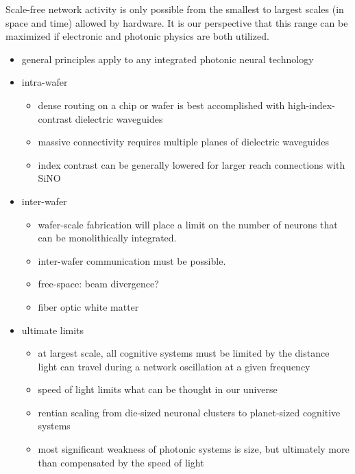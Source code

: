 \documentclass[twocolumn]{article}
\begin{document}
Scale-free network activity is only possible from the smallest to largest scales (in space and  time) allowed by hardware. It is our perspective that this range can be maximized if electronic and photonic physics are both utilized.

\begin{itemize}
\item general principles apply to any integrated photonic neural technology
\item intra-wafer

\begin{itemize}
\item dense routing on a chip or wafer is best accomplished with high-index-contrast dielectric waveguides
\item massive connectivity requires multiple planes of dielectric waveguides
\item index contrast can be generally lowered for larger reach connections with SiNO
\end{itemize}

\item inter-wafer
\begin{itemize}
\item wafer-scale fabrication will place a limit on the number of neurons that can be monolithically integrated. 
\item inter-wafer communication must be possible. 
\item free-space: beam divergence?
\item fiber optic white matter
\end{itemize}

\item ultimate limits
\begin{itemize}
\item at largest scale, all cognitive systems must be limited by the distance light can travel during a network oscillation at a given frequency
\item speed of light limits what can be thought in our universe
\item rentian scaling from die-sized neuronal clusters to planet-sized cognitive systems
\item most significant weakness of photonic systems is size, but ultimately more than compensated by the speed of light
\end{itemize}

\end{itemize}

\vspace{4em}
\end{document}
